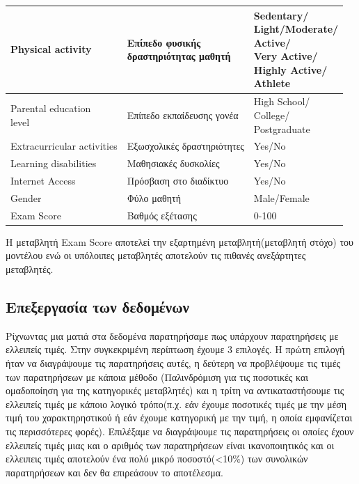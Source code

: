 \documentclass[12pt]{article}
\begin{document}
\begin{center}
\begin{longtable}{|p{5cm}|p{7.1cm}|p{4cm}|}
Physical activity & \makecell[l]{Επίπεδο φυσικής \\ δραστηριότητας μαθητή} & \makecell[l]{Sedentary/ \\ Light/Moderate/ \\ Active/ \\ Very Active/ \\ Highly Active/ \\ Athlete} \\ %
\hline

\makecell[l]{Parental education \\level} & Επίπεδο εκπαίδευσης γονέα & \makecell[l]{High School/ \\ College/ \\ Postgraduate} \\ %
\hline
Extracurricular activities & Εξωσχολικές δραστηριότητες & Yes/No \\ %
\hline
Learning disabilities & Μαθησιακές δυσκολίες & Yes/No \\ %
\hline

Internet Access & Πρόσβαση στο διαδίκτυο & Yes/No \\ %
\hline
Gender & Φύλο μαθητή & Male/Female \\ %
\hline

Exam Score & Βαθμός εξέτασης & 0-100 \\ %
\hline
\end{longtable}
\end{center}

Η μεταβλητή Exam Score αποτελεί την εξαρτημένη μεταβλητή(μεταβλητή στόχο) του μοντέλου ενώ οι υπόλοιπες μεταβλητές αποτελούν τις πιθανές ανεξάρτητες μεταβλητές. 


\subsection{Επεξεργασία των δεδομένων}
Ρίχνωντας μια ματιά στα δεδομένα παρατηρήσαμε πως υπάρχουν παρατηρήσεις με ελλειπείς τιμές. Στην συγκεκριμένη περίπτωση έχουμε 3 επιλογές. Η πρώτη επιλογή ήταν να διαγράψουμε τις παρατηρήσεις αυτές, η δεύτερη να προβλέψουμε τις τιμές των παρατηρήσεων με κάποια μέθοδο (Παλινδρόμιση για τις ποσοτικές και ομαδοποίηση για της κατηγορικές μεταβλητές) και η τρίτη να αντικαταστήσουμε τις ελλειπείς τιμές με κάποιο λογικό τρόπο(π.χ. εάν έχουμε ποσοτικές τιμές με την μέση τιμή του χαρακτηρηστικού ή εάν έχουμε κατηγορική με την τιμή, η οποία εμφανίζεται τις περισσότερες φορές). Επιλέξαμε να διαγράψουμε τις παρατηρήσεις οι οποίες έχουν ελλειπείς τιμές μιας και ο αριθμός των παρατηρήσεων είναι ικανοποιητικός και οι ελλειπεις τιμές αποτελούν ένα πολύ μικρό ποσοστό(<10\(\%\)) των συνολικών παρατηρήσεων και δεν θα επιρεάσουν το αποτέλεσμα. 
\end{document}
